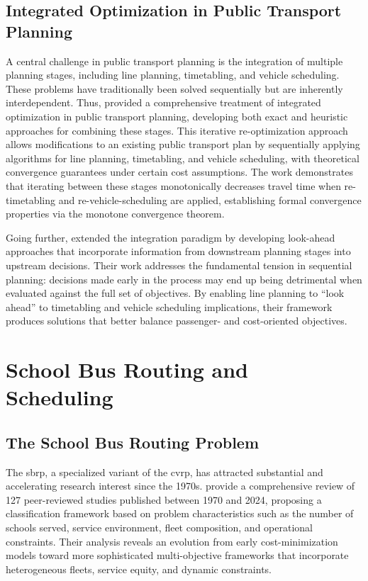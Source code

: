 \subsection{Integrated Optimization in Public Transport Planning}

A central challenge in public transport planning is the integration of multiple planning stages, including line planning, timetabling, and vehicle scheduling. These problems have traditionally been solved sequentially but are inherently interdependent. Thus, \textcite{schieweIntegratedOptimizationPublic2020} provided a comprehensive treatment of integrated optimization in public transport planning, developing both exact and heuristic approaches for combining these stages. This iterative re-optimization approach allows modifications to an existing public transport plan by sequentially applying algorithms for line planning, timetabling, and vehicle scheduling, with theoretical convergence guarantees under certain cost assumptions. The work demonstrates that iterating between these stages monotonically decreases travel time when re-timetabling and re-vehicle-scheduling are applied, establishing formal convergence properties via the monotone convergence theorem.

Going further, \textcite{patzoldLookAheadApproachesIntegrated2017} extended the integration paradigm by developing look-ahead approaches that incorporate information from downstream planning stages into upstream decisions. Their work addresses the fundamental tension in sequential planning: decisions made early in the process may end up being detrimental when evaluated against the full set of objectives. By enabling line planning to ``look ahead'' to timetabling and vehicle scheduling implications, their framework produces solutions that better balance passenger- and cost-oriented objectives.

\section{School Bus Routing and Scheduling}
\subsection{The School Bus Routing Problem}

The \gls{sbrp}, a specialized variant of the \gls{cvrp}, has attracted substantial and accelerating research interest since the 1970s. \textcite{wang2025School} provide a comprehensive review of 127 peer-reviewed studies published between 1970 and 2024, proposing a classification framework based on problem characteristics such as the number of schools served, service environment, fleet composition, and operational constraints. Their analysis reveals an evolution from early cost-minimization models toward more sophisticated multi-objective frameworks that incorporate heterogeneous fleets, service equity, and dynamic constraints.

